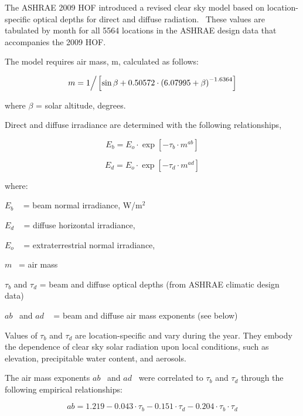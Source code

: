 The ASHRAE 2009 HOF introduced a revised clear sky model based on location-specific optical depths for direct and diffuse radiation.~ These values are tabulated by month for all 5564 locations in the ASHRAE design data that accompanies the 2009 HOF.

The model requires air mass, m, calculated as follows:

\begin{equation}
m = {1 \mathord{\left/ {\vphantom {1 {\left[ {\sin \beta  + 0.50572 \cdot {{\left( {6.07995 + \beta } \right)}^{ - 1.6364}}} \right]}}} \right. } {\left[ {\sin \beta  + 0.50572 \cdot {{\left( {6.07995 + \beta } \right)}^{ - 1.6364}}} \right]}}
\end{equation}

where \(\beta\) = solar altitude, degrees.

Direct and diffuse irradiance are determined with the following relationships,

\begin{equation}
{E_b} = {E_o} \cdot \exp \left[ { - {\tau_b} \cdot {m^{ab}}} \right]
\end{equation}

\begin{equation}
{E_d} = {E_o} \cdot \exp \left[ { - {\tau_d} \cdot {m^{ad}}} \right]
\end{equation}

where:

\({E_b}\) ~ = beam normal irradiance, W/m\(^{2}\)

\({E_d}\) ~ = diffuse horizontal irradiance,

\({E_o}\) ~ = extraterrestrial normal irradiance,

\emph{\(m\)}~ = air mass

$\tau$\(_{b}\) and $\tau$\(_{d}\) = beam and diffuse optical depths (from ASHRAE climatic design data)

\(ab\) ~and \(ad\) ~ = beam and diffuse air mass exponents (see below)

Values of $\tau$\(_{b}\) and $\tau$\(_{d}\) are location-specific and vary during the year. They embody the dependence of clear sky solar radiation upon local conditions, such as elevation, precipitable water content, and aerosols.

The air mass exponents \(ab\) ~and \(ad\) ~were correlated to $\tau$\(_{b}\) and $\tau$\(_{d}\) through the following empirical relationships:

\begin{equation}
ab = 1.219 - 0.043 \cdot {\tau_b} - 0.151 \cdot {\tau_d} - 0.204 \cdot {\tau_b} \cdot {\tau_d}
\end{equation}

